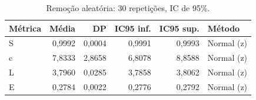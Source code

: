\begin{table}[ht]
\centering
\caption{Remoção aleatória: 30 repetições, IC de 95\%.}
\label{tab:robustezic}
\small
\begin{tabular}{lrrrrl}
\hline
Métrica & Média & DP & IC95 inf. & IC95 sup. & Método \\
\hline
S & 0,9992 & 0,0004 & 0,9991 & 0,9993 & Normal (z) \\
c & 7,8333 & 2,8658 & 6,8078 & 8,8588 & Normal (z) \\
L & 3,7960 & 0,0285 & 3,7858 & 3,8062 & Normal (z) \\
E & 0,2784 & 0,0022 & 0,2776 & 0,2792 & Normal (z) \\
\hline
\end{tabular}
\end{table}
